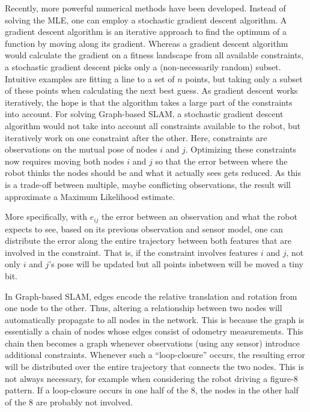 Recently, more powerful numerical methods have been developed. Instead of solving the MLE, one can employ a stochastic gradient descent algorithm. A gradient descent algorithm is an iterative approach to find the optimum of a function by moving along its gradient. Whereas a gradient descent algorithm would calculate the gradient on a fitness landscape from all available constraints, a stochastic gradient descent picks only a (non-necessarily random) subset. Intuitive examples are fitting a line to a set of $n$ points, but taking only a subset of these points when calculating the next best guess. As gradient descent works iteratively, the hope is that the algorithm takes a large part of the constraints into account. For solving Graph-based SLAM, a stochastic gradient descent algorithm would not take into account all constraints available to the robot, but  iteratively work on one constraint after the other. Here, constraints are observations on the mutual pose of nodes $i$ and $j$. Optimizing these constraints now requires moving both nodes $i$ and $j$ so that the error between where the robot thinks the nodes should be and what it actually sees gets reduced.  As this is a trade-off between multiple, maybe conflicting observations, the result will approximate a Maximum Likelihood estimate.

More specifically, with $ e_{ij}$ the error between an observation and what the robot expects to see, based on its previous observation and sensor model, one can distribute the error along the entire trajectory between both features that are involved in the constraint. That is, if the constraint involves features $i$ and $j$, not only $i$ and $j$'s pose will be updated but all points inbetween will be moved a tiny bit.


In Graph-based SLAM, edges encode the relative translation and rotation from one node to the other. Thus, altering a relationship between two nodes will automatically propagate to all nodes in the network. This is because the graph is essentially a chain of nodes whose edges consist of odometry measurements. This chain then becomes a graph whenever observations (using any sensor) introduce additional constraints. Whenever such a ``loop-closure'' occurs, the resulting error will be distributed over the entire trajectory that connects the two nodes. This is not always necessary, for example when considering the robot driving a figure-8 pattern. If a loop-closure occurs in one half of the 8, the nodes in the other half of the 8 are probably not involved.

